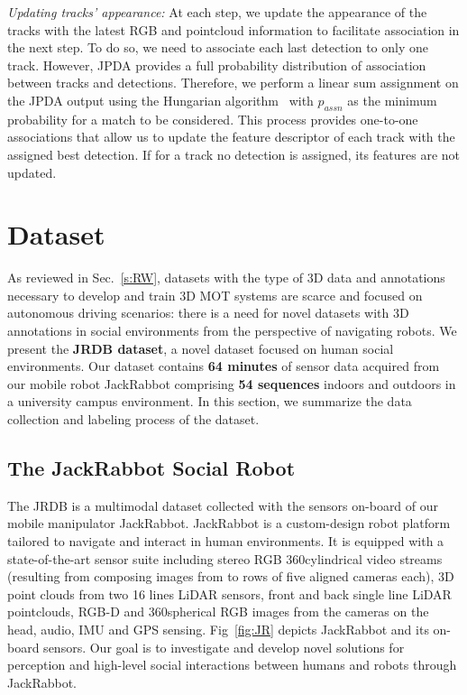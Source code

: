 \documentclass[letterpaper, 10 pt, conference]{ieeeconf}
\newcommand{\jrdb}{JRDB\xspace}
\newcommand{\jackrabbot}{JackRabbot\xspace}
\begin{document}
\textit{Updating tracks' appearance:} At each step, we update the appearance of the tracks with the latest RGB and pointcloud information to facilitate association in the next step. To do so, we need to associate each last detection to only one track. However, JPDA provides a full probability distribution of association between tracks and detections. Therefore, we perform a linear sum assignment on the JPDA output using the Hungarian algorithm~\cite{Kuhn55thehungarian} with $p_{assn}$ as the minimum probability for a match to be considered. This process provides one-to-one associations that allow us to update the feature descriptor of each track with the assigned best detection. If for a track no detection is assigned, its features are not updated. \section{Dataset}

As reviewed in Sec.~\ref{s:RW}, datasets with the type of 3D data and annotations necessary to develop and train 3D MOT systems are scarce and focused on autonomous driving scenarios: there is a need for novel datasets with 3D annotations in social environments from the perspective of navigating robots. We present the \textbf{\jrdb dataset}, a novel dataset focused on human social environments. Our dataset contains {\bf 64 minutes} of sensor data acquired from our mobile robot \jackrabbot comprising {\bf 54 sequences} indoors and outdoors in a university campus environment. In this section, we summarize the data collection and labeling process of the dataset. 



\subsection{The \jackrabbot Social Robot}





The \jrdb is a multimodal dataset collected with the sensors on-board of our mobile manipulator \jackrabbot. \jackrabbot is a custom-design robot platform tailored to navigate and interact in human environments. It is equipped with a state-of-the-art sensor suite including stereo RGB 360\degree cylindrical video streams (resulting from composing images from to rows of five aligned cameras each), 3D point clouds from two 16 lines LiDAR sensors, front and back single line LiDAR pointclouds, RGB-D and 360\degree spherical RGB images from the cameras on the head, audio, IMU and GPS sensing. Fig~\ref{fig:JR} depicts \jackrabbot and its on-board sensors. Our goal is to investigate and develop novel solutions for perception and high-level social interactions between humans and robots through \jackrabbot.
\end{document}
